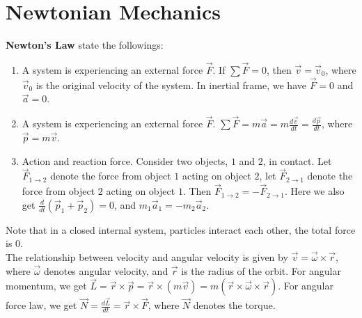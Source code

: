 \documentclass[11pt,oneside]{book}
\theoremstyle{break}
\theoremstyle{break}
\begin{document}
\section[Newtonian Mechanics]{\color{red}Newtonian Mechanics\color{black}}
\textbf{Newton's Law} state the followings:
\begin{enumerate}
\item A system is experiencing an external force $\vec{F}$. If $\sum \vec{F} = 0$, then $\vec{v} = \vec{v}_0$, where $\vec{v}_0$ is the original velocity of the system. In inertial frame, we have $\vec{F} = 0$ and $\vec{a} = 0$.
\item A system is experiencing an external force $\vec{F}$. $\sum \vec{F} = m\vec{a} = m \frac{d\vec{v}}{dt} = \frac{d\vec{p}}{dt}$, where $\vec{p} = m\vec{v}$.
\item Action and reaction force. Consider two objects, $1$ and $2$, in contact. Let $\vec{F}_{1\to 2}$ denote the force from object $1$ acting on object $2$, let $\vec{F}_{2\to 1}$ denote the force from object $2$ acting on object $1$. Then $\vec{F}_{1\to 2} = -\vec{F}_{2\to 1}$. Here we also get $\frac{d}{dt}(\vec{p}_1 + \vec{p}_2) = 0$, and $m_1 \vec{a}_1 = -m_2 \vec{a}_2$. 
\end{enumerate}
Note that in a closed internal system, particles interact each other, the total force is $0$. \\

The relationship between velocity and angular velocity is given by $\vec{v} = \vec{\omega} \times \vec{r}$, where $\vec{\omega}$ denotes angular velocity, and $\vec{r}$ is the radius of the orbit. For angular momentum, we get $\vec{L} = \vec{r}\times \vec{p} = \vec{r} \times (m\vec{v}) = m(\vec{r}\times \vec{\omega}\times \vec{r})$. For angular force law, we get $\vec{N} = \frac{d\vec{L}}{dt} = \vec{r}\times \vec{F}$, where $\vec{N}$ denotes the torque. \\
\end{document}
